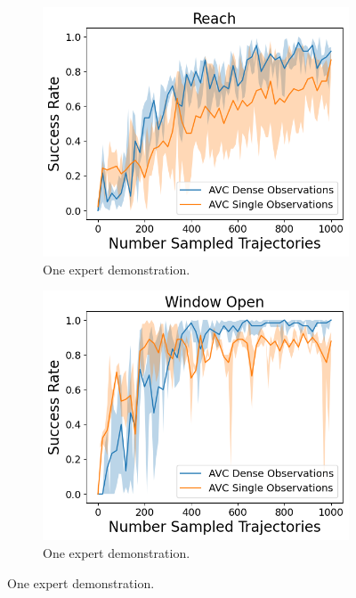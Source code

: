 \begin{figure}[htbp]
  \centering
  \begin{subfigure}[t]{0.32\textwidth}
    \includegraphics[width=\textwidth]{images/dense_vs_sparse_1/Reach.png}
    \caption{One expert demonstration.}
  \end{subfigure}
  \hfill
  \begin{subfigure}[t]{0.32\textwidth}
    \includegraphics[width=\textwidth]{images/dense_vs_sparse_1/Window Open.png}
    \caption{One expert demonstration.}
  \end{subfigure}

\end{figure}
